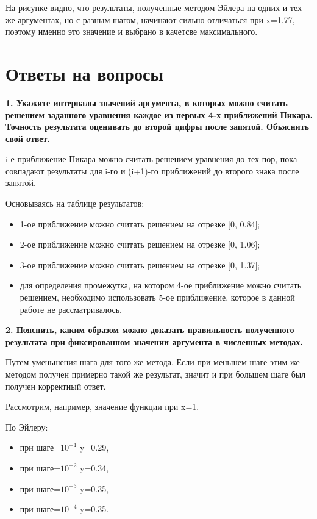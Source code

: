 \documentclass[12pt]{report}
\begin{document}
На рисунке видно, что результаты, полученные методом Эйлера на одних и тех же аргументах, но с разным шагом, начинают сильно отличаться при x=1.77, поэтому именно это значение и выбрано в качетсве максимального.

\chapter{Ответы на вопросы}

\textbf{1. Укажите интервалы значений аргумента, в которых можно считать решением заданного  уравнения каждое из первых 4-х приближений Пикара. Точность результата оценивать до второй цифры после запятой. Объяснить свой ответ.}

i-е приближение Пикара можно считать решением уравнения до тех пор, пока совпадают результаты для i-го и (i+1)-го приближений до второго знака после запятой.

Основываясь на таблице результатов:

\begin{itemize}
	\item 1-ое приближение можно считать решением на отрезке [0, 0.84];
	\item 2-ое приближение можно считать решением на отрезке [0, 1.06];
	\item 3-ое приближение можно считать решением на отрезке [0, 1.37];
	\item для определения промежутка, на котором 4-ое приближение можно считать решением, необходимо использовать 5-ое приближение, которое в данной работе не рассматривалось.
\end{itemize}



\textbf{2. Пояснить, каким образом можно доказать правильность полученного результата при фиксированном значении аргумента в численных методах.}

Путем уменьшения шага для того же метода. Если при меньшем шаге этим же методом получен примерно такой же результат, значит и при большем шаге был получен корректный ответ.

Рассмотрим, например, значение функции при x=1.

По Эйлеру: 
\begin{itemize}
	\item при шаге=$10^{-1}$ y=0.29, 
	\item при шаге=$10^{-2}$ y=0.34, 
	\item при шаге=$10^{-3}$ y=0.35, 
	\item при шаге=$10^{-4}$ y=0.35. 
\end{itemize}
\end{document}
